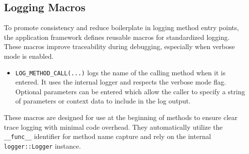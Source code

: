 \subsection*{Logging Macros}
To promote consistency and reduce boilerplate in logging method entry points, the application framework defines reusable macros for standardized logging. These macros improve traceability during debugging, especially when verbose mode is enabled.
\begin{itemize}\itemsep0em
    \item \texttt{LOG\_METHOD\_CALL(...)} logs the name of the calling method when it is entered. It uses the internal logger and respects the verbose mode flag. Optional parameters can be entered which allow the caller to specify a string of parameters or context data to include in the log output.
\end{itemize}
These macros are designed for use at the beginning of methods to ensure clear trace logging with minimal code overhead. They automatically utilize the \texttt{\_\_func\_\_} identifier for method name capture and rely on the internal \texttt{logger::Logger} instance.


